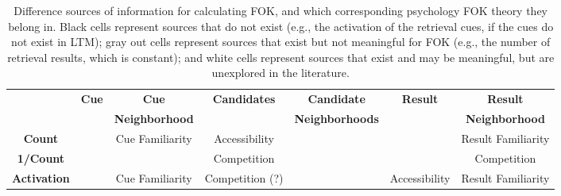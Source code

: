 \documentclass[10pt,letterpaper]{article}
\newcommand{\fixme}[2][]{#2}
\renewcommand{\fixme}[2][]{\textcolor{red}{#2}}
\newcommand{\tableheader}[1]{\multirow{2}{*}{\textbf{#1}}}
\newcommand{\whitecell}[0]{}
\newcommand{\graycell}[0]{\cellcolor{gray!70}}
\newcommand{\blackcell}[0]{\cellcolor{black}}
\begin{document}
\begin{table*}[ht]
\begin{tabular}{c|cccccc}
\whitecell           &  \tableheader{Cue}   &  \textbf{Cue}           &  \tableheader{Candidates}  &  \textbf{Candidate}      &  \tableheader{Result}  &  \textbf{Result}        \\  
\whitecell           &  \whitecell          &  \textbf{Neighborhood}  &  \whitecell                &  \textbf{Neighborhoods}  &  \whitecell            &  \textbf{Neighborhood}  \\  
\hline                                                                                                                                                                               
\textbf{Count}       &  \graycell           &  Cue Familiarity        &  Accessibility             &  \whitecell              &  \graycell             &  Result Familiarity     \\  
\textbf{1/Count}     &  \graycell           &  \whitecell             &  Competition               &  \whitecell              &  \graycell             &  Competition            \\  
\textbf{Activation}  &  \blackcell          &  Cue Familiarity        &  Competition (?)                &  \whitecell              &  Accessibility         &  Result Familiarity     \\  
\end{tabular}


\caption{
    Difference sources of information for calculating FOK, and which corresponding psychology FOK theory they belong in.
    Black cells represent sources that do not exist (e.g., the activation of the retrieval cues, if the cues do not exist in LTM);
    gray out cells represent sources that exist but not meaningful for FOK (e.g., the number of retrieval results, which is constant);
    and white cells represent sources that exist and may be meaningful, but are unexplored in the literature.
    \fixme[Need to explain ``neighborhood'']{}
}
\label{sources}
\end{table*}
\end{document}
